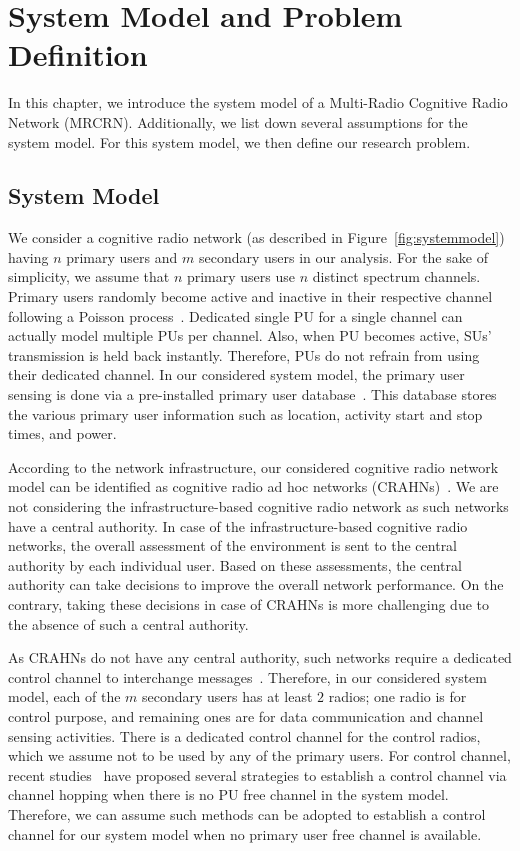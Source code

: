 \chapter{System Model and Problem Definition}\label{chap:systemModel}

In this chapter, we introduce the system model of a Multi-Radio Cognitive Radio Network (MRCRN). Additionally, we list down several assumptions for the system model. For this system model, we then define our research problem.

\section{System Model}

We consider a cognitive radio network (as described in Figure~\ref{fig:systemmodel}) having $n$ primary users and $m$ secondary users in our analysis. For the sake of simplicity, we assume that $n$ primary users use $n$ distinct spectrum channels. Primary users randomly become active and inactive in their respective channel following a Poisson process~\cite{Ross}. Dedicated single PU for a single channel can actually model multiple PUs per channel. Also, when PU becomes active, SUs' transmission is held back instantly. Therefore, PUs do not refrain from using their dedicated channel. In our considered system model, the primary user sensing is done via a pre-installed primary user database~\cite{ghasemi2008spectrum}. This database stores the various primary user information such as location, activity start and stop times, and power.  

According to the network infrastructure, our considered cognitive radio network model can be identified as cognitive radio ad hoc networks (CRAHNs)~\cite{akyildiz2009crahns}. We are not considering the infrastructure-based cognitive radio network as such networks have a central authority. In case of the infrastructure-based cognitive radio networks, the overall assessment of the environment is sent to the central authority by each individual user. Based on these assessments, the central authority can take decisions to improve the overall network performance. On the contrary, taking these decisions in case of CRAHNs is more challenging due to the absence of such a central authority.

As CRAHNs do not have any central authority, such networks require a dedicated control channel to interchange messages~\cite{akyildiz2009crahns}. Therefore, in our considered system model, each of the $m$ secondary users has at least $2$ radios; one radio is for control purpose, and remaining ones are for data communication and channel sensing activities. There is a dedicated control channel for the control radios, which we assume not to be used by any of the primary users. For control channel, recent studies~\cite{ACH, lo2011survey, thilina2016dccc} have proposed several strategies to establish a control channel via channel hopping when there is no PU free channel in the system model. Therefore, we can assume such methods can be adopted to establish a control channel for our system model when no primary user free channel is available. 

